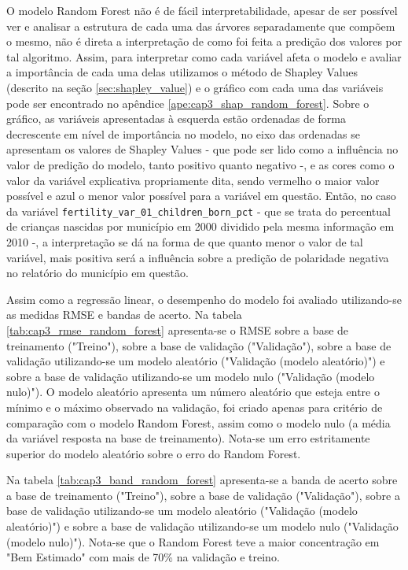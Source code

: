 O modelo Random Forest não é de fácil interpretabilidade, apesar de ser possível ver e analisar a estrutura de cada uma das árvores separadamente que compõem o mesmo, não é direta a interpretação de como foi feita a predição dos valores por tal algoritmo. Assim, para interpretar como cada variável afeta o modelo e avaliar a importância de cada uma delas utilizamos o método de Shapley Values (descrito na seção \ref{sec:shapley_value}) e o gráfico com cada uma das variáveis pode ser encontrado no apêndice \ref{ape:cap3_shap_random_forest}. Sobre o gráfico, as variáveis apresentadas à esquerda estão ordenadas de forma decrescente em nível de importância no modelo, no eixo das ordenadas se apresentam os valores de Shapley Values - que pode ser lido como a influência no valor de predição do modelo, tanto positivo quanto negativo -, e as cores como o valor da variável explicativa propriamente dita, sendo vermelho o maior valor possível e azul o menor valor possível para a variável em questão. Então, no caso da variável \verb|fertility_var_01_children_born_pct| - que se trata do percentual de crianças nascidas por município em 2000 dividido pela mesma informação em 2010 -, a interpretação se dá na forma de que quanto menor o valor de tal variável, mais positiva será a influência sobre a predição de polaridade negativa no relatório do município em questão.

Assim como a regressão linear, o desempenho do modelo foi avaliado utilizando-se as medidas RMSE e bandas de acerto. Na tabela \ref{tab:cap3_rmse_random_forest} apresenta-se o RMSE sobre a base de treinamento ("Treino"), sobre a base de validação ("Validação"), sobre a base de validação utilizando-se um modelo aleatório ("Validação (modelo aleatório)") e sobre a base de validação utilizando-se um modelo nulo ("Validação (modelo nulo)"). O modelo aleatório apresenta um número aleatório que esteja entre o mínimo e o máximo observado na validação, foi criado apenas para critério de comparação com o modelo Random Forest, assim como o modelo nulo (a média da variável resposta na base de treinamento). Nota-se um erro estritamente superior do modelo aleatório sobre o erro do Random Forest.

Na tabela \ref{tab:cap3_band_random_forest} apresenta-se a banda de acerto sobre a base de treinamento ("Treino"), sobre a base de validação ("Validação"), sobre a base de validação utilizando-se um modelo aleatório ("Validação (modelo aleatório)") e sobre a base de validação utilizando-se um modelo nulo ("Validação (modelo nulo)"). Nota-se que o Random Forest teve a maior concentração em "Bem Estimado" com mais de 70\% na validação e treino.

